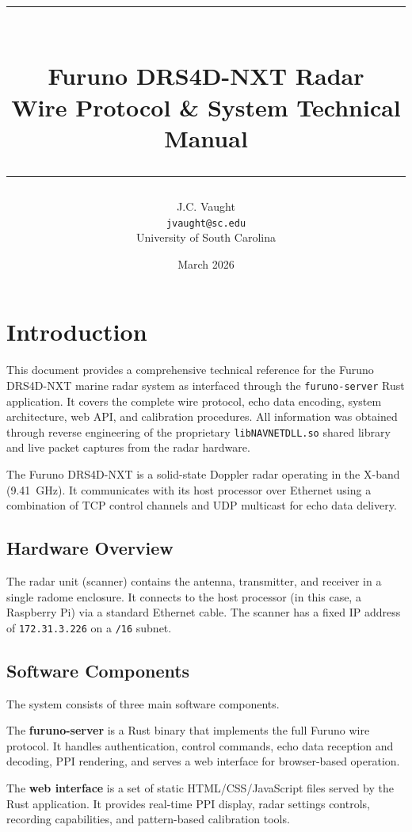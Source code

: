 \documentclass[11pt,letterpaper]{article}
\title{
    \vspace{-1cm}
    {\color{garnet}\rule{\textwidth}{2pt}}\\[0.5cm]
    {\Huge\bfseries\color{garnet} Furuno DRS4D-NXT Radar}\\[0.3cm]
    {\LARGE\color{black90} Wire Protocol \& System Technical Manual}\\[0.3cm]
    {\color{garnet}\rule{\textwidth}{2pt}}
}
\author{J.C. Vaught\\
\texttt{jvaught@sc.edu}\\[0.3em]
University of South Carolina}
\date{March 2026}
\begin{document}
\maketitle
\thispagestyle{fancy}
\tableofcontents
\newpage

\section{Introduction}

This document provides a comprehensive technical reference for the Furuno DRS4D-NXT marine radar system as interfaced through the \texttt{furuno-server} Rust application. It covers the complete wire protocol, echo data encoding, system architecture, web API, and calibration procedures. All information was obtained through reverse engineering of the proprietary \texttt{libNAVNETDLL.so} shared library and live packet captures from the radar hardware.

The Furuno DRS4D-NXT is a solid-state Doppler radar operating in the X-band (9.41~GHz). It communicates with its host processor over Ethernet using a combination of TCP control channels and UDP multicast for echo data delivery.

\subsection{Hardware Overview}

The radar unit (scanner) contains the antenna, transmitter, and receiver in a single radome enclosure. It connects to the host processor (in this case, a Raspberry Pi) via a standard Ethernet cable. The scanner has a fixed IP address of \texttt{172.31.3.226} on a \texttt{/16} subnet.

\subsection{Software Components}

The system consists of three main software components.

The \textbf{furuno-server} is a Rust binary that implements the full Furuno wire protocol. It handles authentication, control commands, echo data reception and decoding, PPI rendering, and serves a web interface for browser-based operation.

The \textbf{web interface} is a set of static HTML/CSS/JavaScript files served by the Rust application. It provides real-time PPI display, radar settings controls, recording capabilities, and pattern-based calibration tools.
\end{document}
